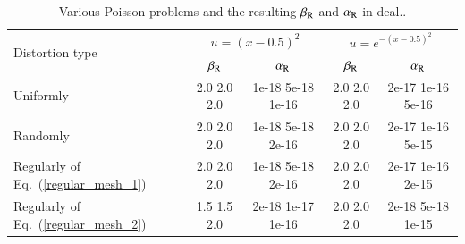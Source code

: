 \documentclass[review,3p]{elsarticle}
\begin{document}
\begin{table}[!ht]
\caption{Various Poisson problems and the resulting $\beta_{\rm R}$ and $\alpha_{\rm R}$ in deal..}
\centering
\scriptsize
\begin{tabular}{l|c|c|c|c}
 \multirow{2}{*}{Distortion type} & \multicolumn{2}{c|}{$u=(x-0.5)^2$} & \multicolumn{2}{c}{$u=e^{-(x-0.5)^2}$} \\ \cline{2-5}
  & $\beta_{\rm R}$ & $\alpha_{\rm R}$ & $\beta_{\rm R}$ & $\alpha_{\rm R}$ \\ \hline
 Uniformly & 2.0 2.0 2.0 & 1e-18 5e-18 1e-16 & 2.0 2.0 2.0 & 2e-17 1e-16 5e-16 \\ \hline  
 Randomly & 2.0 2.0 2.0 & 1e-18 5e-18 2e-16 & 2.0 2.0 2.0 & 2e-17 1e-16 5e-15 \\ \hline
 Regularly of Eq.~(\ref{regular_mesh_1}) & 2.0 2.0 2.0 & 1e-18 5e-18 2e-16 & 2.0 2.0 2.0 & 2e-17 1e-16 2e-15 \\ \hline
 Regularly of Eq.~(\ref{regular_mesh_2}) & 1.5 1.5 2.0 & 2e-18 1e-17 1e-16 & 2.0 2.0 2.0 & 2e-18 5e-18 1e-15 \\ 
\end{tabular}
\label{results_various_Pois_1d_dealii}
\end{table}
\end{document}
